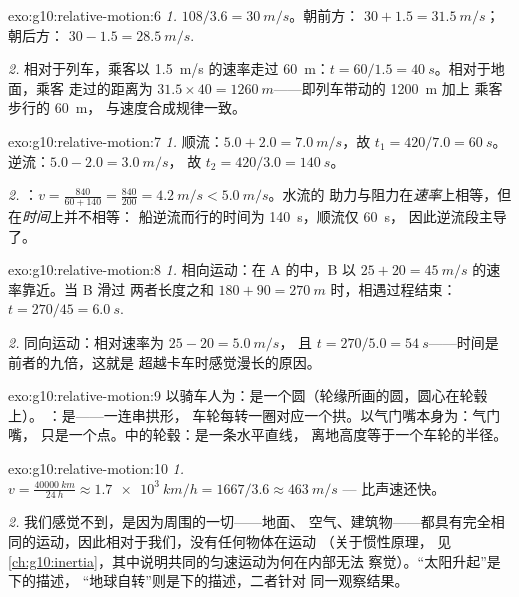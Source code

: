 \begin{solution}{exo:g10:relative-motion:6}
\emph{1.} $108/3.6 = \qty{30}{m/s}$。朝前方：
$30 + 1.5 = \qty{31.5}{m/s}$；朝后方：
$30 - 1.5 = \qty{28.5}{m/s}$.

\emph{2.} 相对于列车，乘客以
\qty{1.5}{m/s} 的速率走过 \qty{60}{m}：$t = 60/1.5 = \qty{40}{s}$。相对于地面，乘客
走过的距离为 $31.5 \times 40 = \qty{1260}{m}$——即列车带动的 \qty{1200}{m} 加上
乘客步行的 \qty{60}{m}，
与速度合成规律一致。
\end{solution}

\begin{solution}{exo:g10:relative-motion:7}
\emph{1.} 顺流：$5.0 + 2.0 = \qty{7.0}{m/s}$，故
$t_1 = 420/7.0 = \qty{60}{s}$。逆流：$5.0 - 2.0 = \qty{3.0}{m/s}$，
故 $t_2 = 420/3.0 = \qty{140}{s}$。

\emph{2.} ：$v = \frac{840}{60 + 140}
= \frac{840}{200} = \qty{4.2}{m/s} < \qty{5.0}{m/s}$。水流的
助力与阻力在\emph{速率}上相等，但在\emph{时间}上并不相等：
船逆流而行的时间为 \qty{140}{s}，顺流仅 \qty{60}{s}，
因此逆流段主导了。
\end{solution}

\begin{solution}{exo:g10:relative-motion:8}
\emph{1.} 相向运动：在 A 的中，B 以
$25 + 20 = \qty{45}{m/s}$ 的速率靠近。当 B 滑过
两者长度之和 $180 + 90 = \qty{270}{m}$ 时，相遇过程结束：
$t = 270/45 = \qty{6.0}{s}$.

\emph{2.} 同向运动：相对速率为 $25 - 20 = \qty{5.0}{m/s}$，
且 $t = 270/5.0 = \qty{54}{s}$——时间是前者的九倍，这就是
超越卡车时感觉漫长的原因。
\end{solution}

\begin{solution}{exo:g10:relative-motion:9}
以骑车人为：是一个圆（轮缘所画的圆，圆心在轮毂上）。
：是——一连串拱形，
车轮每转一圈对应一个拱。以气门嘴本身为：气门嘴，
只是一个点。中的轮毂：是一条水平直线，
离地高度等于一个车轮的半径。
\end{solution}

\begin{solution}{exo:g10:relative-motion:10}
\emph{1.} $v = \frac{\qty{40000}{km}}{\qty{24}{h}}
\approx \qty{1.7e3}{km/h} = 1667/3.6 \approx \qty{463}{m/s}$ ---
比声速还快。

\emph{2.} 我们感觉不到，是因为周围的一切——地面、
空气、建筑物——都具有完全相同的运动，因此相对于我们，没有任何物体在运动
（关于惯性原理，
见\cref{ch:g10:inertia}，其中说明共同的匀速运动为何在内部无法
察觉）。“太阳升起”是下的描述，
“地球自转”则是下的描述，二者针对
同一观察结果。
\end{solution}

